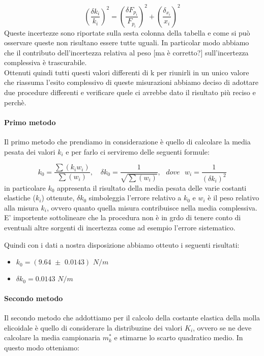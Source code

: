 \begin{equation*}
	\left(\frac{\delta {k_{i}}}{k_{i}}\right)^2  =  \left(\frac{\delta F_{p_{i}}}{F_{p_{i}}}\right)^2  +  \left(\frac{\delta_{x_{i}}}{x_{i}}\right)^2 
\end{equation*}
%
Queste incertezze sono riportate sulla sesta colonna della tabella e come si può osservare queste non risultano essere tutte uguali. In particolar modo abbiamo che il contributo dell'incertezza relativa al peso [ma è corretto?] sull'incertezza complessiva è trascurabile.\\
Ottenuti quindi tutti questi valori differenti di k per riunirli in un unico valore che riassuma l'esito complessivo di queste misurazioni abbiamo deciso di adottare due procedure differenti e verificare quele ci avrebbe dato il risultato più reciso e perchè.

\paragraph{Primo metodo\\}
Il primo metodo che prendiamo in considerazione è quello di calcolare la media pesata dei valori $k_{i}$ e per farlo ci serviremo delle seguenti formule:

\begin{equation*}
		k_{0} = \frac{\sum (k_i w_i)}{\sum (w_i)} , \,\,\,\,\,\, \delta k_0 = \frac{1}{\sqrt{\sum (w_i)}} , \,\,\,\,dove\,\,\,\, w_i = \frac{1}{(\delta k_i)^2}
\end{equation*}
%
in particolare $k_0$ appresenta il risultato della media pesata delle varie costanti elastiche ($k_i$) ottenute, $\delta k_0$ simboleggia l'errore relativo a $k_0$ e $w_i$ è il peso relativo alla misura $k_i$, ovvero quanto quella misura contribuisce nella media complessiva. E' importente sottolineare che la procedura non è in grdo di tenere conto di eventuali altre sorgenti di incertezza come ad esempio l'errore sistematico.

Quindi con i dati a nostra disposizione abbiamo otteuto i seguenti risultati:
\begin{itemize}
	\item{  $  k_{0} = (9.64 \,\, \pm \,\, 0.0143)\,\,N/m  $  }
	\item{  $  \delta k_0 = 0.0143 \,\, N/m  $  }
\end{itemize}

\paragraph{Secondo metodo\\}
Il secondo metodo che addottiamo per il calcolo della costante elastica della molla elicoidale è quello di considerare la distribuzine dei valori $K_i$, ovvero se ne deve calcolare la media campionaria $m^*_k$ e stimarne lo scarto quadratico medio. In questo modo otteniamo:

